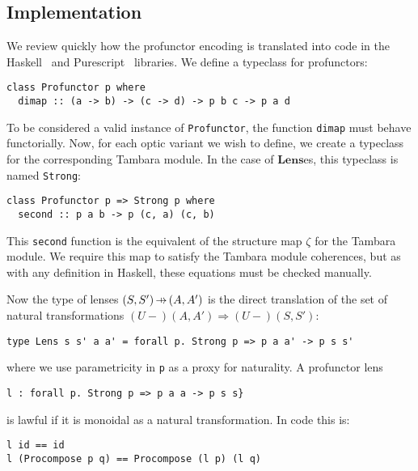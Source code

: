 \documentclass[11pt,letterpaper]{article}
\theoremstyle{plain}
\theoremstyle{definition}
\newcommand{\Lens}{\mathbf{Lens}}
\newcommand{\Traversal}{\mathbf{Traversal}}
\newcommand{\hto}{\ensuremath{\,\mathaccent\shortmid\rightarrow\,}}
\begin{document}
\subsection{Implementation}
We review quickly how the profunctor encoding is translated into code in the Haskell~\cite{LensLibrary} and Purescript~\cite{PurescriptLibrary} libraries. We define a typeclass for profunctors:
\begin{verbatim}
class Profunctor p where
  dimap :: (a -> b) -> (c -> d) -> p b c -> p a d
\end{verbatim}
To be considered a valid instance of \texttt{Profunctor}, the function \texttt{dimap} must behave functorially. Now, for each optic variant we wish to define, we create a typeclass for the corresponding Tambara module. In the case of $\Lens$es, this typeclass is named \texttt{Strong}:
\begin{verbatim}
class Profunctor p => Strong p where
  second :: p a b -> p (c, a) (c, b)
\end{verbatim}
This \texttt{second} function is the equivalent of the structure map $\zeta$ for the Tambara module. We require this map to satisfy the Tambara module coherences, but as with any definition in Haskell, these equations must be checked manually.

Now the type of lenses $(S, S') \hto (A, A')$ is the direct translation of the set of natural transformations $(U-)(A,A') \Rightarrow (U-)(S,S')$:
\begin{verbatim}
type Lens s s' a a' = forall p. Strong p => p a a' -> p s s'
\end{verbatim}
where we use parametricity in \texttt{p} as a proxy for naturality. A profunctor lens 
\begin{verbatim}
l : forall p. Strong p => p a a -> p s s}
\end{verbatim}
is lawful if it is monoidal as a natural transformation. In code this is:
\begin{verbatim}
l id == id
l (Procompose p q) == Procompose (l p) (l q)
\end{verbatim}

%
%
\end{document}
